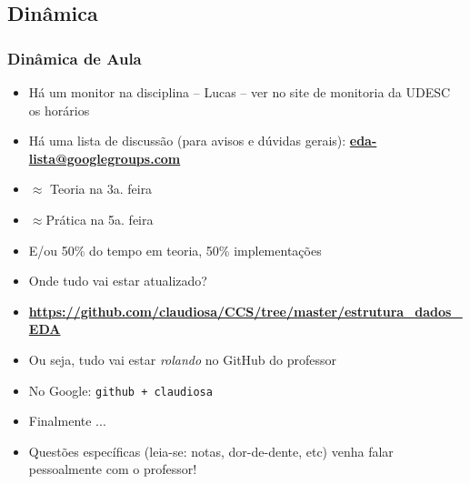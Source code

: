 \subsection{Dinâmica}
\begin{frame} [allowframebreaks=0.9]

    \frametitle{Dinâmica de Aula}

    \begin{itemize}
    
       \item Há um monitor na disciplina -- Lucas -- ver no site de monitoria da UDESC     os horários
       
       \item Há uma lista de discussão (para avisos e dúvidas gerais):  \textbf{\url{eda-lista@googlegroups.com}}
       
      \item $\approx $ Teoria na 3a. feira
      \item $\approx $Prática na 5a. feira
      \item E/ou 50\% do tempo em teoria, 50\% implementações 
      \item Onde tudo vai estar atualizado?
   \end{itemize}
    \pause
 
 \newpage
    
  \begin{itemize}    
      \item \textcolor{red}{\textbf{\url{https://github.com/claudiosa/CCS/tree/master/estrutura_dados_EDA}}} 
     
      \item Ou seja, tudo vai estar \textit{rolando} no GitHub do professor
      
      \item No Google: \texttt{github + claudiosa}
   
      \item Finalmente ...   
  \end{itemize}
    
    
    \pause
    \newpage
    
    \begin{itemize}    
    
   \item Questões específicas (leia-se: notas, dor-de-dente, etc) venha falar pessoalmente com o professor!
      
   \end{itemize}

\end{frame}



